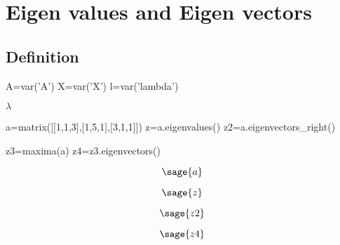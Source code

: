 \chapter{Eigen values and Eigen vectors}

\section{Definition}
\begin{sagesilent}
        A=var('A')
        X=var('X')
        l=var('lambda')
\end{sagesilent}
$\lambda$
\begin{sageblock}
        a=matrix([[1,1,3],[1,5,1],[3,1,1]])
        z=a.eigenvalues()
        z2=a.eigenvectors_right()

        z3=maxima(a)
        z4=z3.eigenvectors()
\end{sageblock}

$$\sage{a}$$

$$\sage{z}$$ 

$$\sage{z2}$$


$$\sage{z4}$$
